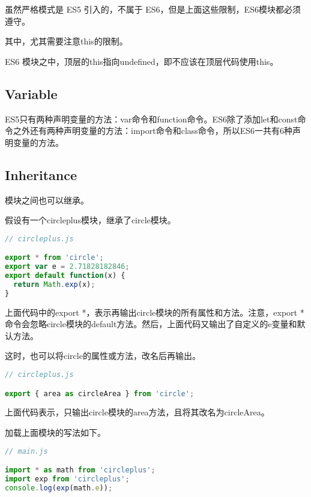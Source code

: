 虽然严格模式是 ES5 引入的，不属于 ES6，但是上面这些限制，ES6模块都必须遵守。

其中，尤其需要注意this的限制。

\begin{compactitem}
\item ES6 模块之中，顶层的this指向undefined，即不应该在顶层代码使用this。
\end{compactitem}




\subsection{Variable}


ES5只有两种声明变量的方法：var命令和function命令。ES6除了添加let和const命令之外还有两种声明变量的方法：import命令和class命令，所以ES6一共有6种声明变量的方法。



\subsection{Inheritance}


模块之间也可以继承。


假设有一个circleplus模块，继承了circle模块。

\begin{lstlisting}[language=JavaScript]
// circleplus.js

export * from 'circle';
export var e = 2.71828182846;
export default function(x) {
  return Math.exp(x);
}
\end{lstlisting}


上面代码中的export *，表示再输出circle模块的所有属性和方法。注意，export *命令会忽略circle模块的default方法。然后，上面代码又输出了自定义的e变量和默认方法。

这时，也可以将circle的属性或方法，改名后再输出。


\begin{lstlisting}[language=JavaScript]
// circleplus.js

export { area as circleArea } from 'circle';
\end{lstlisting}



上面代码表示，只输出circle模块的area方法，且将其改名为circleArea。

加载上面模块的写法如下。




\begin{lstlisting}[language=JavaScript]
// main.js

import * as math from 'circleplus';
import exp from 'circleplus';
console.log(exp(math.e));
\end{lstlisting}

